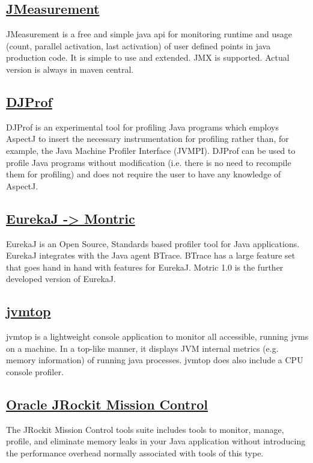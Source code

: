 \subsection{\href{https://sourceforge.net/projects/jmeasurement2/}{JMeasurement}}

JMeasurement is a free and simple java api for monitoring runtime and usage (count, parallel activation, last activation) of user defined points in java production code. It is simple to use and extended. JMX is supported. Actual version is always in maven central.


\subsection{\href{http://homepages.mcs.vuw.ac.nz/~djp/djprof/}{DJProf}}

DJProf is an experimental tool for profiling Java programs which employs AspectJ to insert the necessary instrumentation for profiling rather than, for example, the Java Machine Profiler Interface (JVMPI). DJProf can be used to profile Java programs without modification (i.e. there is no need to recompile them for profiling) and does not require the user to have any knowledge of AspectJ.


\subsection{\href{https://github.com/joachimhs/Montric}{EurekaJ -> Montric}}

EurekaJ is an Open Source, Standards based profiler tool for Java applications. EurekaJ integrates with the Java agent BTrace. BTrace has a large feature set that goes hand in hand with features for EurekaJ. Motric 1.0 is the further developed version of EurekaJ.


\subsection{\href{https://github.com/patric-r/jvmtop}{jvmtop}}

jvmtop is a lightweight console application to monitor all accessible, running jvms on a machine.
In a top-like manner, it displays JVM internal metrics (e.g. memory information) of running java processes.
jvmtop does also include a CPU console profiler.


\subsection{\href{http://www.oracle.com/technetwork/middleware/jrockit/overview/index-090630.html}{Oracle JRockit Mission Control}}

The JRockit Mission Control tools suite includes tools to monitor, manage, profile, and eliminate memory leaks in your Java application without introducing the performance overhead normally associated with tools of this type.